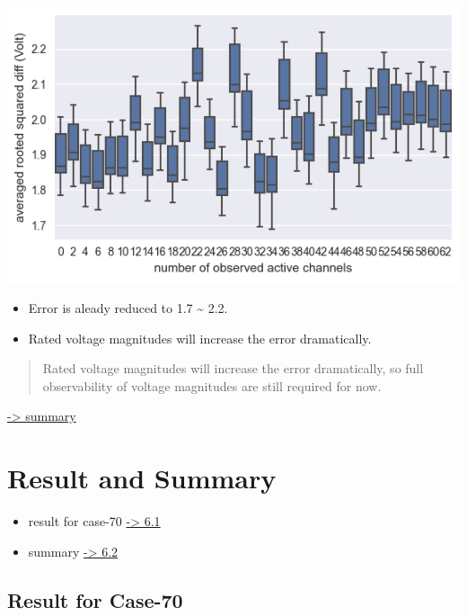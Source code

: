 \documentclass[
]{book}
\providecommand{\tightlist}{%
  \setlength{\itemsep}{0pt}\setlength{\parskip}{0pt}}
\begin{document}
\begin{center}\includegraphics{Pictures/figErrorObsBRM} \end{center}

\begin{itemize}
\tightlist
\item
  Error is aleady reduced to 1.7 \textasciitilde{} 2.2.
\item
  Rated voltage magnitudes will increase the error dramatically.
\end{itemize}

\begin{quote}
Rated voltage magnitudes will increase the error dramatically, so full
observability of voltage magnitudes are still required for now.
\end{quote}

\protect\hyperlink{summary}{-\textgreater{} summary}

\hypertarget{result-and-summary}{%
\chapter{Result and Summary}\label{result-and-summary}}

\begin{itemize}
\tightlist
\item
  result for case-70 \protect\hyperlink{result}{-\textgreater{} 6.1}
\item
  summary \protect\hyperlink{summary}{-\textgreater{} 6.2}
\end{itemize}

\hypertarget{result}{%
\section{Result for Case-70}\label{result}}
\end{document}
